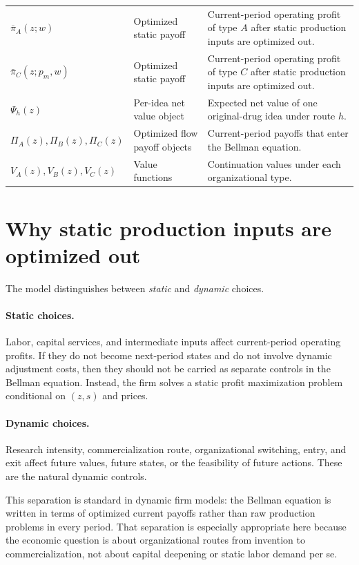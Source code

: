 \documentclass[12pt]{article}
\begin{document}
\begin{longtable}{p{}p{}p{}}
$\bar{\pi}_A(z;w)$ & Optimized static payoff & Current-period operating profit of type $A$ after static production inputs are optimized out. \\[0.4em]

$\bar{\pi}_C(z;p_m,w)$ & Optimized static payoff & Current-period operating profit of type $C$ after static production inputs are optimized out. \\[0.4em]

$\Psi_h(z)$ & Per-idea net value object & Expected net value of one original-drug idea under route $h$. \\[0.4em]

$\Pi_A(z),\Pi_B(z),\Pi_C(z)$ & Optimized flow payoff objects & Current-period payoffs that enter the Bellman equation. \\[0.4em]

$V_A(z),V_B(z),V_C(z)$ & Value functions & Continuation values under each organizational type. \\

\bottomrule
\end{longtable}

\section{Why static production inputs are optimized out}

The model distinguishes between \emph{static} and \emph{dynamic} choices.

\paragraph{Static choices.}
Labor, capital services, and intermediate inputs affect current-period operating profits.
If they do not become next-period states and do not involve dynamic adjustment costs, then
they should not be carried as separate controls in the Bellman equation. Instead, the firm
solves a static profit maximization problem conditional on $(z,s)$ and prices.

\paragraph{Dynamic choices.}
Research intensity, commercialization route, organizational switching, entry, and exit affect
future values, future states, or the feasibility of future actions. These are the natural
dynamic controls.

This separation is standard in dynamic firm models: the Bellman equation is written in
terms of optimized current payoffs rather than raw production problems in every period.
That separation is especially appropriate here because the economic question is about
organizational routes from invention to commercialization, not about capital deepening
or static labor demand per se.
\end{document}
